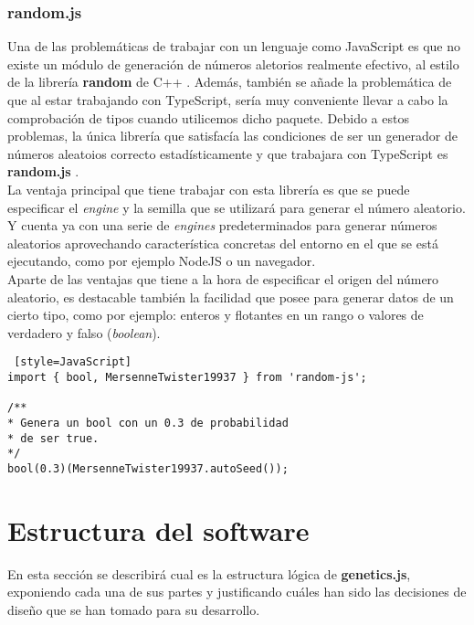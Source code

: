 \subsubsection{random.js}

Una de las problemáticas de trabajar con un lenguaje como JavaScript es que no existe un módulo de generación de números aletorios realmente efectivo, al estilo de la librería \textbf{random} de C++ \cite{randomcpp}. Además, también se añade la problemática de que al estar trabajando con TypeScript, sería muy conveniente llevar a cabo la comprobación de tipos cuando utilicemos dicho paquete. Debido a estos problemas, la única librería que satisfacía las condiciones de ser un generador de números aleatoios correcto estadísticamente y que trabajara con TypeScript es \textbf{random.js} \cite{randomjs}. \\

La ventaja principal que tiene trabajar con esta librería es que se puede especificar el \textit{engine} y la semilla que se utilizará para generar el número aleatorio. Y cuenta ya con una serie de \textit{engines} predeterminados para generar números aleatorios aprovechando característica concretas del entorno en el que se está ejecutando, como por ejemplo NodeJS o un navegador. \\

Aparte de las ventajas que tiene a la hora de especificar el origen del número aleatorio, es destacable también la facilidad que posee para generar datos de un cierto tipo, como por ejemplo: enteros y flotantes en un rango o valores de verdadero y falso (\textit{boolean}). \\

\begin{lstlisting} [style=JavaScript]
import { bool, MersenneTwister19937 } from 'random-js';

/**
* Genera un bool con un 0.3 de probabilidad
* de ser true.
*/
bool(0.3)(MersenneTwister19937.autoSeed());
\end{lstlisting}

\section{Estructura del software}

En esta sección se describirá cual es la estructura lógica de \textbf{genetics.js}, exponiendo cada una de sus partes y justificando cuáles han sido las decisiones de diseño que se han tomado para su desarrollo.

